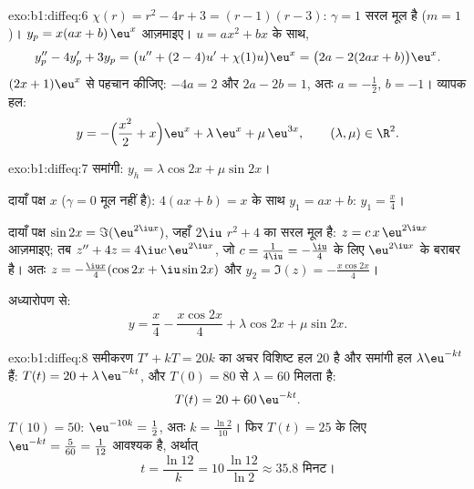 \begin{solution}{exo:b1:diffeq:6}
$\chi(r) = r^2 - 4r + 3 = (r-1)(r-3)$: $\gamma = 1$ सरल मूल है ($m = 1$)।
$y_p = x(ax + b)\,\eu^x$ आज़माइए। $u = ax^2 + bx$ के साथ,
\[
y_p'' - 4y_p' + 3y_p = \bigl(u'' + (2 - 4)u' + \chi(1) u\bigr)\eu^x
= \bigl(2a - 2(2ax + b)\bigr)\eu^x .
\]
$(2x + 1)\eu^x$ से पहचान कीजिए: $-4a = 2$ और $2a - 2b = 1$, अतः $a =
-\frac12$, $b = -1$। व्यापक हल:
\[
y = -\Bigl(\frac{x^2}{2} + x\Bigr)\eu^{x} + \lambda\,\eu^{x} +
\mu\,\eu^{3x}, \qquad (\lambda, \mu) \in \R^2 .
\]
\end{solution}

\begin{solution}{exo:b1:diffeq:7}
समांगी: $y_h = \lambda\cos 2x + \mu\sin 2x$।

दायाँ पक्ष $x$ ($\gamma = 0$ मूल नहीं है): $4(ax + b) = x$ के साथ $y_1 = ax
+ b$: $y_1 = \frac x4$।

दायाँ पक्ष $\sin 2x = \Im(\eu^{2\iu x})$, जहाँ $2\iu$ $r^2 + 4$ का सरल मूल
है: $z = c\,x\,\eu^{2\iu x}$ आज़माइए; तब $z'' + 4z = 4\iu c\,\eu^{2\iu x}$,
जो $c = \frac{1}{4\iu} = -\frac{\iu}{4}$ के लिए $\eu^{2\iu x}$ के बराबर है।
अतः $z = -\frac{\iu x}{4}(\cos 2x + \iu \sin 2x)$ और $y_2 = \Im(z) =
-\frac{x\cos 2x}{4}$।

अध्यारोपण से:
\[
y = \frac{x}{4} - \frac{x\cos 2x}{4} + \lambda\cos 2x + \mu\sin 2x .
\]
\end{solution}

\begin{solution}{exo:b1:diffeq:8}
समीकरण $T' + kT = 20k$ का अचर विशिष्ट हल $20$ है और समांगी हल
$\lambda\eu^{-kt}$ हैं: $T(t) = 20 + \lambda\,\eu^{-kt}$, और $T(0) = 80$ से
$\lambda = 60$ मिलता है:
\[
T(t) = 20 + 60\,\eu^{-kt} .
\]
$T(10) = 50$: $\eu^{-10k} = \frac12$, अतः $k = \frac{\ln 2}{10}$। फिर $T(t)
= 25$ के लिए $\eu^{-kt} = \frac{5}{60} = \frac{1}{12}$ आवश्यक है, अर्थात्
\[
t = \frac{\ln 12}{k} = 10\,\frac{\ln 12}{\ln 2} \approx 35.8
\text{ मिनट।}
\]
\end{solution}

